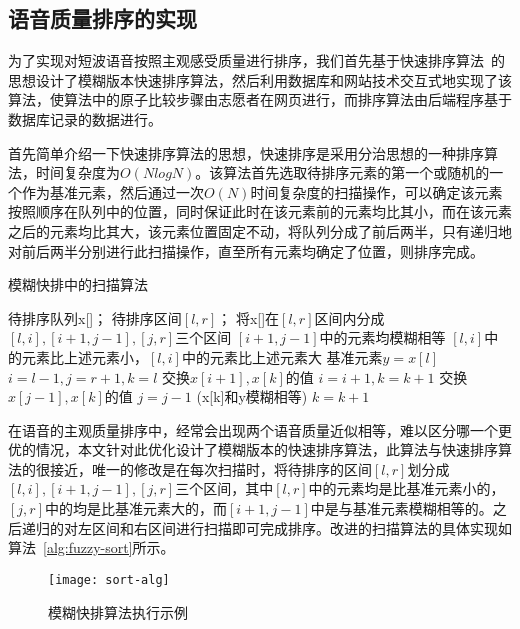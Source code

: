 \subsection{语音质量排序的实现}

为了实现对短波语音按照主观感受质量进行排序，我们首先基于快速排序算法~\cite{hoare1962quicksort}的思想设计了模糊版本快速排序算法，然后利用数据库和网站技术交互式地实现了该算法，使算法中的原子比较步骤由志愿者在网页进行，而排序算法由后端程序基于数据库记录的数据进行。

首先简单介绍一下快速排序算法的思想，快速排序是采用分治思想的一种排序算法，时间复杂度为$O(NlogN)$。该算法首先选取待排序元素的第一个或随机的一个作为基准元素，然后通过一次$O(N)$时间复杂度的扫描操作，可以确定该元素按照顺序在队列中的位置，同时保证此时在该元素前的元素均比其小，而在该元素之后的元素均比其大，该元素位置固定不动，将队列分成了前后两半，只有递归地对前后两半分别进行此扫描操作，直至所有元素均确定了位置，则排序完成。

\begin{algorithm}
    \caption{模糊快排中的扫描算法}
    \label{alg:fuzzy-sort}
\begin{algorithmic}[1]
\INPUT
    \Statex 待排序队列x[]；
    \Statex 待排序区间$[l, r]$；
\OUTPUT
    \Statex 将x[]在$[l, r]$区间内分成$[l, i], [i+1,  j-1], [j, r]$三个区间
    \Statex $[i+1,  j-1]$中的元素均模糊相等
    \Statex $[l, i]$中的元素比上述元素小，$[l, i]$中的元素比上述元素大
\State 基准元素$y = x[l]$
\State $i=l-1, j=r+1, k=l$
        \State 交换$x[i+1], x[k]$的值
        \State $i = i + 1, k = k + 1$
        \State 交换$x[j-1], x[k]$的值
        \State $j=j-1$
    \Else
        \State (x[k]和y模糊相等) $k=k+1$ 
    \EndIf
\EndWhile
\end{algorithmic}
\end{algorithm}

在语音的主观质量排序中，经常会出现两个语音质量近似相等，难以区分哪一个更优的情况，本文针对此优化设计了模糊版本的快速排序算法，此算法与快速排序算法的很接近，唯一的修改是在每次扫描时，将待排序的区间$[l, r]$划分成$[l, i], [i+1,  j-1], [j, r]$三个区间，其中$[l, r]$中的元素均是比基准元素小的，$[j, r]$中的均是比基准元素大的，而$[i+1,  j-1]$中是与基准元素模糊相等的。之后递归的对左区间和右区间进行扫描即可完成排序。改进的扫描算法的具体实现如算法~\ref{alg:fuzzy-sort}所示。

\begin{figure}
\centering
\texttt{[image: sort-alg]}
\caption{模糊快排算法执行示例\label{fig:fuzzy-sort}}
\end{figure}


